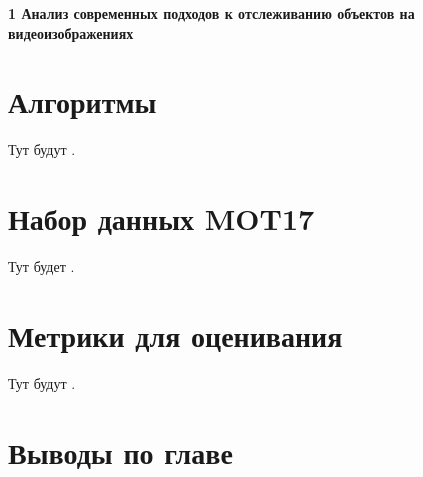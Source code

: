 \newpage
\begin{flushleft}
  \textbf{\large 1 Анализ современных подходов к отслеживанию объектов на видеоизображениях}
\end{flushleft}

\section{Алгоритмы}
Тут будут \cite{aharon2022bot, cao2023observation, du2023strongsort, maggiolino2023deep, stadler2023improved, zhang2022bytetrack}.

\section{Набор данных MOT17}
Тут будет \cite{dendorfer2021motchallenge}.

\section{Метрики для оценивания}
Тут будут \cite{luiten2021hota, bernardin2008evaluating, ristani2016performance}.

\section{Выводы по главе}
